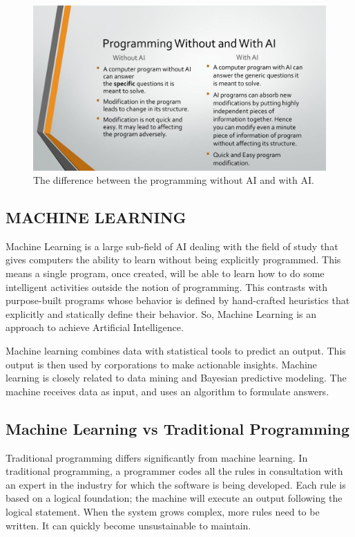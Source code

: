 \documentclass{article}
\begin{document}
\begin{figure}[ht]
\centering
\includegraphics[width=1\textwidth]{image1.jpg}
\caption{The difference between the programming without AI and with AI\cite{Deshai_2017}.}
\label{fig: the difference between programming without AI and with AI.}
\end{figure}

\subsection{MACHINE LEARNING}
Machine Learning is a large sub-field of AI dealing with the field of study that gives computers the ability to learn without being explicitly programmed. This means a single program, once created, will be able to learn how to do some intelligent activities outside the notion of programming. This contrasts with purpose-built programs whose behavior is defined by hand-crafted heuristics that explicitly and statically define their behavior. So, Machine Learning is an approach to achieve Artificial Intelligence.

Machine learning combines data with statistical tools to predict an output. This output is then used by corporations to make actionable insights. Machine learning is closely related to data mining and Bayesian predictive modeling. The machine receives data as input, and uses an algorithm to formulate answers.

\subsection{Machine Learning vs Traditional Programming}
Traditional programming differs significantly from machine learning. In traditional programming, a programmer codes all the rules in consultation with an expert in the industry for which the software is being developed. Each rule is based on a logical foundation; the machine will execute an output following the logical statement. When the system grows complex, more rules need to be written. It can quickly become unsustainable to maintain.
\end{document}
